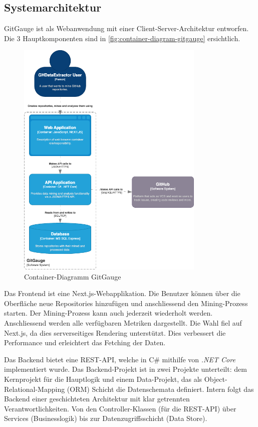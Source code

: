 \subsection{Systemarchitektur}
GitGauge ist als Webanwendung mit einer Client-Server-Architektur entworfen. Die 3 Hauptkomponenten sind in \autoref{fig:container-diagram-gitgauge} ersichtlich. 
\begin{figure}[htbp]
    \centering
        \includegraphics[width=0.8\textwidth]{Figures/container-diagram-gitgauge.png}
    \caption{Container-Diagramm GitGauge \parencite{grand_joel_vt1_joelgrand_repository_2024}}
    \label{fig:container-diagram-gitgauge}
\end{figure}

Das Frontend ist eine Next.js-Webapplikation. Die Benutzer können über die Oberfläche neue Repositories hinzufügen und anschliessend den Mining-Prozess starten. Der Mining-Prozess kann auch jederzeit wiederholt werden. Anschliessend werden alle verfügbaren Metriken dargestellt. Die Wahl fiel auf Next.js, da dies serverseitiges Rendering unterstützt. Dies verbessert die Performance und erleichtert das Fetching der Daten. \parencite{grand_joel_vt1_joelgrand_repository_2024}

Das Backend bietet eine REST-API, welche in C\# mithilfe von \textit{.NET Core} implementiert wurde. Das Backend-Projekt ist in zwei Projekte unterteilt: dem Kernprojekt für die Hauptlogik und einem Data-Projekt, das als Object-Relational-Mapping (ORM) Schicht die Datenschemata definiert. Intern folgt das Backend einer geschichteten Architektur mit klar getrennten Verantwortlichkeiten. Von den Controller-Klassen (für die REST-API) über Services (Businesslogik) bis zur Datenzugriffsschicht (Data Store). \parencite{grand_joel_vt1_joelgrand_repository_2024}

